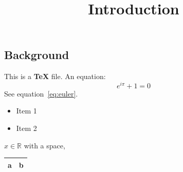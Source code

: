 \title{Introduction}
\subsection{Background}\label{sec:intro}

This is a \textbf{TeX} file. An equation:
\begin{equation}\label{eq:euler}
  e^{i\pi} + 1 = 0
\end{equation}
See equation~\eqref{eq:euler}.

\begin{itemize}
  \item Item 1
  \item Item 2
\end{itemize}


\newcommand{\R}{\mathbb{R}}
$x \in \R$ with \hspace{1cm} a space,\vspace{2mm}
\begin{tabular}{|c|c|}\hline a & b \\\hline\end{tabular}
